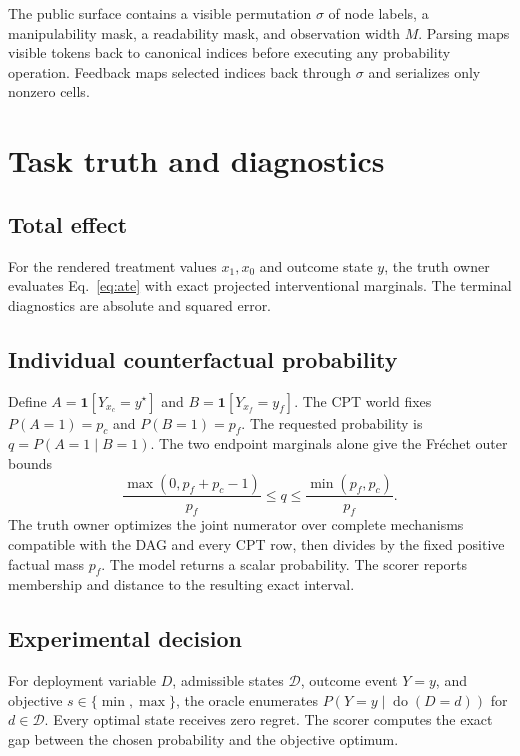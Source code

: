 \documentclass{article}
\newcommand{\doop}{\operatorname{do}}
\begin{document}
The public surface contains a visible permutation $\sigma$ of node labels, a
manipulability mask, a readability mask, and observation width $M$. Parsing maps
visible tokens back to canonical indices before executing any probability
operation. Feedback maps selected indices back through $\sigma$ and serializes
only nonzero cells.

\section{Task truth and diagnostics}

\subsection{Total effect}

For the rendered treatment values $x_1,x_0$ and outcome state $y$, the truth owner
evaluates Eq.~\ref{eq:ate} with exact projected interventional marginals. The
terminal diagnostics are absolute and squared error.

\subsection{Individual counterfactual probability}

Define $A=\mathbf{1}[Y_{x_c}=y^\star]$ and
$B=\mathbf{1}[Y_{x_f}=y_f]$. The CPT world fixes
$P(A=1)=p_c$ and $P(B=1)=p_f$. The requested probability is
$q=P(A=1\mid B=1)$. The two endpoint marginals alone give the Fr\'echet outer
bounds
\begin{equation}
\frac{\max(0,p_f+p_c-1)}{p_f}\le q\le
\frac{\min(p_f,p_c)}{p_f}.
\end{equation}
The truth owner optimizes the joint numerator over complete mechanisms compatible
with the DAG and every CPT row, then divides by the fixed positive factual mass
$p_f$. The model returns a scalar probability. The scorer reports membership and
distance to the resulting exact interval.

\subsection{Experimental decision}

For deployment variable $D$, admissible states $\mathcal D$, outcome event
$Y=y$, and objective $s\in\{\min,\max\}$, the oracle enumerates
$P(Y=y\mid\doop(D=d))$ for $d\in\mathcal D$. Every optimal state receives zero
regret. The scorer computes the exact gap between the chosen probability and the
objective optimum.
\end{document}
